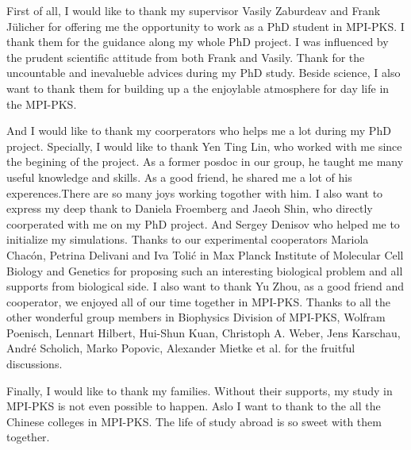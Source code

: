 
\begin{acknowledgements}      


First of all, I would like to thank my supervisor Vasily Zaburdeav and Frank J\"{u}licher for offering me the opportunity to work as a PhD student in MPI-PKS. 
I thank them for the guidance along my whole PhD project. I was influenced by the prudent scientific attitude from both Frank and Vasily. Thank for the uncountable and inevalueble advices during my PhD study. Beside science, I also want to thank them for building up a the enjoylable atmosphere for day life in the MPI-PKS.


And I would like to thank my coorperators who helps me a lot during my PhD project. Specially, I would like to thank Yen Ting Lin, who worked with me since the begining of the project. As a former posdoc in our group, he taught me many useful knowledge and skills. As a good friend, he shared me a lot of his experences.There are so many joys working togother with him. I also want to express my deep thank to Daniela Froemberg and Jaeoh Shin, who directly coorperated with me on my PhD project. And Sergey Denisov who helped me to initialize my simulations. Thanks to our experimental cooperators Mariola Chac\'{o}n, Petrina Delivani and Iva Toli\'{c} in Max Planck Institute of Molecular Cell Biology and Genetics for proposing such an interesting biological problem and all supports from biological side. I also want to thank Yu Zhou, as a good friend and cooperator, we enjoyed all of our time together in MPI-PKS. Thanks to all the other wonderful group members in Biophysics Division of MPI-PKS, Wolfram Poenisch, Lennart Hilbert, Hui-Shun Kuan, Christoph A. Weber, Jens Karschau, Andr\'{e} Scholich, Marko Popovic, Alexander Mietke et al. for the fruitful discussions. 

    Finally, I would like to thank my families. Without their supports, my study in MPI-PKS is not even possible to happen. Aslo I want to thank to the all the Chinese colleges in MPI-PKS. The life of study abroad is so sweet with them together.



\end{acknowledgements}


